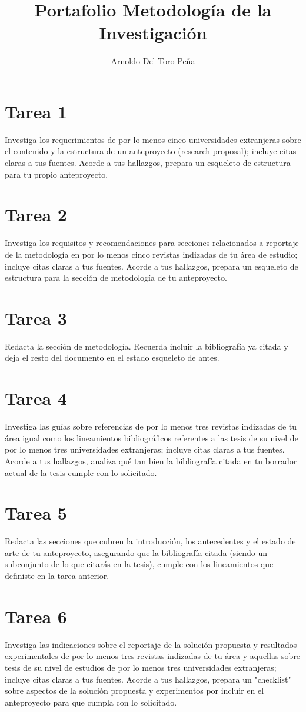 \documentclass[12pt,letterpaper]{article}
\title{Portafolio Metodología de la Investigación}
\author{Arnoldo Del Toro Peña}
\begin{document}
\section*{Tarea 1}
Investiga los requerimientos de por lo menos cinco universidades extranjeras sobre el contenido y la estructura de un anteproyecto (research proposal); incluye citas claras a tus fuentes. Acorde a tus hallazgos, prepara un esqueleto de estructura para tu propio anteproyecto.

\section*{Tarea 2}
Investiga los requisitos y recomendaciones para secciones relacionados a reportaje de la metodología en por lo menos cinco revistas indizadas de tu área de estudio; incluye citas claras a tus fuentes. Acorde a tus hallazgos, prepara un esqueleto de estructura para la sección de metodología de tu anteproyecto.

\section*{Tarea 3}
Redacta la sección de metodología. Recuerda incluir la bibliografía ya citada y deja el resto del documento en el estado esqueleto de antes.

\section*{Tarea 4}
Investiga las guías sobre referencias de por lo menos tres revistas indizadas de tu área igual como los lineamientos bibliográficos referentes a las tesis de su nivel de por lo menos tres universidades extranjeras; incluye citas claras a tus fuentes. Acorde a tus hallazgos, analiza qué tan bien la bibliografía citada en tu borrador actual de la tesis cumple con lo solicitado.
\section*{Tarea 5}
Redacta las secciones que cubren la introducción, los antecedentes y el estado de arte de tu anteproyecto, asegurando que la bibliografía citada (siendo un subconjunto de lo que citarás en la tesis), cumple con los lineamientos que definiste en la tarea anterior.


\section*{Tarea 6}
Investiga las indicaciones sobre el reportaje de la solución propuesta y resultados experimentales de por lo menos tres revistas indizadas de tu área y aquellas sobre tesis de su nivel de estudios de por lo menos tres universidades extranjeras; incluye citas claras a tus fuentes. Acorde a tus hallazgos, prepara un "checklist" sobre aspectos de la solución propuesta y experimentos por incluir en el anteproyecto para que cumpla con lo solicitado.

\end{document}
